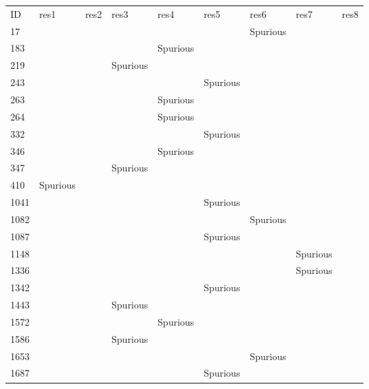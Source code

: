 \begin{table}
\begin{tabular}{lllllllll}
ID    & res1         & res2         & res3         & res4         & res5         & res6         & res7         & res8\\
17    &              &              &              &              &              & Spurious \\
183   &              &              &              & Spurious \\
219   &              &              & Spurious \\
243   &              &              &              &             & Spurious \\
263   &              &              &              & Spurious \\
264   &              &              &              & Spurious \\
332   &              &              &              &             & Spurious \\
346   &              &              &              & Spurious \\
347   &              &              & Spurious \\
410   & Spurious \\
1041  &              &              &              &             & Spurious \\
1082  &              &              &              &              &              & Spurious \\
1087  &              &              &              &             & Spurious \\
1148  &              &              &              &              &              &              & Spurious \\
1336  &              &              &              &              &              &              & Spurious \\
1342  &              &              &              &             & Spurious \\
1443  &              &              & Spurious \\
1572  &              &              &              & Spurious \\
1586  &              &              & Spurious \\
1653  &              &              &              &              &              & Spurious \\
1687  &              &              &              &             & Spurious \\

\end{tabular}
\end{table}
